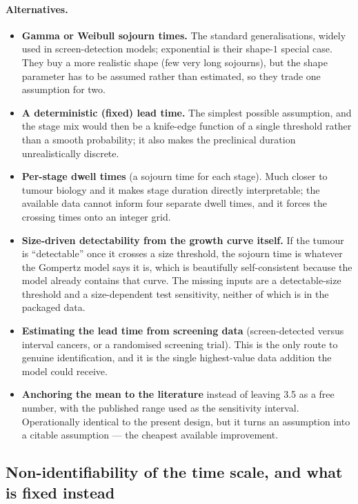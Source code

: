 \documentclass[12pt,a4paper]{article}
\newcommand{\alt}[1]{\paragraph{Alternatives.} #1}
\begin{document}
\alt{\begin{itemize}[nosep]
  \item \textbf{Gamma or Weibull sojourn times.} The standard generalisations, widely used in
        screen-detection models; exponential is their shape-$1$ special case. They buy a more realistic
        shape (few very long sojourns), but the shape parameter has to be assumed rather than estimated,
        so they trade one assumption for two.
  \item \textbf{A deterministic (fixed) lead time.} The simplest possible assumption, and the stage mix
        would then be a knife-edge function of a single threshold rather than a smooth probability; it
        also makes the preclinical duration unrealistically discrete.
  \item \textbf{Per-stage dwell times} (a sojourn time for each stage). Much closer to tumour biology and
        it makes stage duration directly interpretable; the available data cannot inform four separate
        dwell times, and it forces the crossing times onto an integer grid.
  \item \textbf{Size-driven detectability from the growth curve itself.} If the tumour is ``detectable''
        once it crosses a size threshold, the sojourn time is whatever the Gompertz model says it is,
        which is beautifully self-consistent because the model already contains that curve. The missing
        inputs are a detectable-size threshold and a size-dependent test sensitivity, neither of which is
        in the packaged data.
  \item \textbf{Estimating the lead time from screening data} (screen-detected versus interval cancers,
        or a randomised screening trial). This is the only route to genuine identification, and it is the
        single highest-value data addition the model could receive.
  \item \textbf{Anchoring the mean to the literature} instead of leaving 3.5 as a free number, with the
        published range used as the sensitivity interval. Operationally identical to the present design,
        but it turns an assumption into a citable assumption --- the cheapest available improvement.
\end{itemize}}

\subsection{Non-identifiability of the time scale, and what is fixed instead}
\label{sec:nonident}
\end{document}
